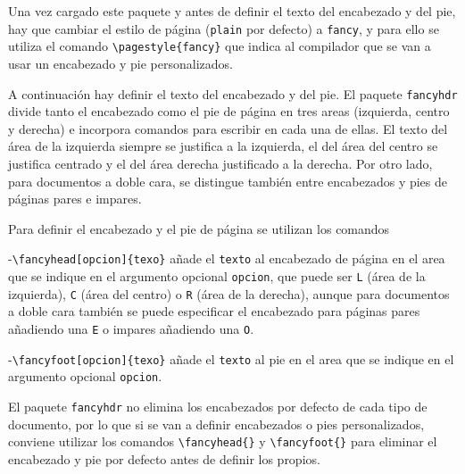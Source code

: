\documentclass[
  a4paper,
]{scrreport}
\theoremstyle{definition}
\theoremstyle{remark}
\begin{document}
Una vez cargado este paquete y antes de definir el texto del encabezado
y del pie, hay que cambiar el estilo de página (\texttt{plain} por
defecto) a \texttt{fancy}, y para ello se utiliza el comando
\texttt{\textbackslash{}pagestyle\{fancy\}} que indica al compilador que
se van a usar un encabezado y pie personalizados.

A continuación hay definir el texto del encabezado y del pie. El paquete
\texttt{fancyhdr} divide tanto el encabezado como el pie de página en
tres areas (izquierda, centro y derecha) e incorpora comandos para
escribir en cada una de ellas. El texto del área de la izquierda siempre
se justifica a la izquierda, el del área del centro se justifica
centrado y el del área derecha justificado a la derecha. Por otro lado,
para documentos a doble cara, se distingue también entre encabezados y
pies de páginas pares e impares.

Para definir el encabezado y el pie de página se utilizan los comandos

-\texttt{\textbackslash{}fancyhead{[}opcion{]}\{texo\}} añade el
\texttt{texto} al encabezado de página en el area que se indique en el
argumento opcional \texttt{opcion}, que puede ser \texttt{L} (área de la
izquierda), \texttt{C} (área del centro) o \texttt{R} (área de la
derecha), aunque para documentos a doble cara también se puede
especificar el encabezado para páginas pares añadiendo una \texttt{E} o
impares añadiendo una \texttt{O}.

-\texttt{\textbackslash{}fancyfoot{[}opcion{]}\{texo\}} añade el
\texttt{texto} al pie en el area que se indique en el argumento opcional
\texttt{opcion}.

\begin{tcolorbox}[enhanced jigsaw, colframe=quarto-callout-warning-color-frame, opacityback=0, title=\textcolor{quarto-callout-warning-color}{\faExclamationTriangle}\hspace{0.5em}{Advertencia}, bottomrule=.15mm, left=2mm, coltitle=black, arc=.35mm, leftrule=.75mm, colback=white, rightrule=.15mm, colbacktitle=quarto-callout-warning-color!10!white, toprule=.15mm, breakable, opacitybacktitle=0.6, bottomtitle=1mm, toptitle=1mm, titlerule=0mm]

El paquete \texttt{fancyhdr} no elimina los encabezados por defecto de
cada tipo de documento, por lo que si se van a definir encabezados o
pies personalizados, conviene utilizar los comandos
\texttt{\textbackslash{}fancyhead\{\}} y
\texttt{\textbackslash{}fancyfoot\{\}} para eliminar el encabezado y pie
por defecto antes de definir los propios.

\end{tcolorbox}
\end{document}
